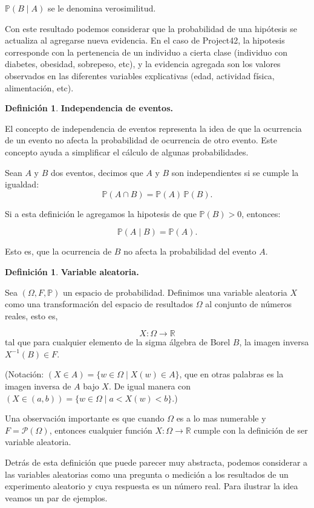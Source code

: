 \documentclass[
 12pt,
 letterpaper,
]{article}
\theoremstyle{teoremaBreak}
\theoremstyle{plain}
\theoremstyle{definition}
\newtheorem{definicion}[teorema]{Definición}
\begin{document}
$\mathbb{P}(B \mid A)$ se le denomina verosimilitud.

Con este resultado podemos considerar que la probabilidad de una
hipótesis se actualiza al agregarse nueva evidencia. En el caso de
Project42, la hipotesis corresponde con la pertenencia de un individuo a
cierta clase (individuo con diabetes, obesidad, sobrepeso, etc), y la
evidencia agregada son los valores observados en las diferentes
variables explicativas (edad, actividad física, alimentación, etc).

\begin{definicion}
\textbf{Independencia de eventos.}

El concepto de independencia de eventos representa la idea de que la ocurrencia de un evento no afecta 
la probabilidad de ocurrencia de otro evento. Este concepto ayuda a simplificar el cálculo de algunas 
probabilidades.

Sean $A$ y $B$ dos eventos, decimos que $A$ y $B$ son independientes si se cumple la igualdad:
$$\mathbb{P}(A \cap B) = \mathbb{P}(A)\,\mathbb{P}(B).$$

Si a esta definición le agregamos la hipotesis de que $\mathbb{P}(B) > 0$, entonces:

$$\mathbb{P}(A \mid B) = \mathbb{P}(A).$$

Esto es, que la ocurrencia de $B$ no afecta la probabilidad del evento $A$.
\end{definicion}

\begin{definicion}
\textbf{Variable aleatoria.}

Sea $(\Omega, F, \mathbb{P})$ un espacio de probabilidad. Definimos una variable
aleatoria $X$ como una transformación del espacio de resultados $\Omega$ al
conjunto de números reales, esto es,

\[
X:\Omega \to \mathbb{R}
\]
tal que para cualquier elemento de la sigma álgebra de Borel $B$, la
imagen inversa $X^{-1}(B) \in F$.
\end{definicion}

(Notación: $(X \in A) = \{w \in \Omega \mid X(w) \in A\}$, que en otras
palabras es la imagen inversa de $A$ bajo $X$. De igual manera con $(X \in (a,
b)) = \{w \in \Omega \mid a < X(w) < b\}$.)

Una observación importante es que cuando $\Omega$ es a lo mas numerable y $F =
\mathcal{P}(\Omega)$, entonces cualquier función $X:\Omega \to \mathbb{R}$ cumple con la
definición de ser variable aleatoria.

Detrás de esta definición que puede parecer muy abstracta, podemos
considerar a las variables aleatorias como una pregunta o medición a los
resultados de un experimento aleatorio y cuya respuesta es un número
real. Para ilustrar la idea veamos un par de ejemplos.
\end{document}

